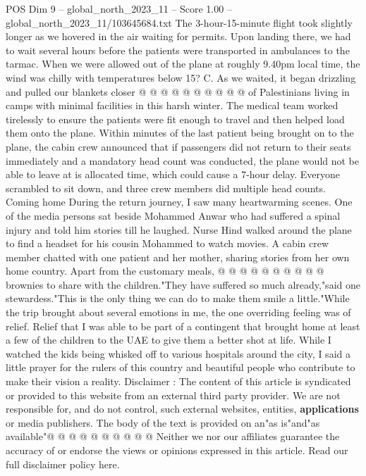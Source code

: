 \begin{textsample}{POS Dim 9 – global\_north\_2023\_11 – Score 1.00 – global\_north\_2023\_11/103645684.txt}
The 3-hour-15-minute flight took slightly longer as we hovered in the air waiting for permits.
Upon landing there, we had to wait several hours before the patients were transported in ambulances to the tarmac.
When we were allowed out of the plane at roughly 9.40pm local time, the wind was chilly with temperatures below 15?
C.
As we waited, it began drizzling and pulled our blankets closer @ @ @ @ @ @ @ @ @ @ of Palestinians living in camps with minimal facilities in this harsh winter.
The medical team worked tirelessly to ensure the patients were fit enough to travel and then helped load them onto the plane.
Within minutes of the last patient being brought on to the plane, the cabin crew announced that if passengers did not return to their seats immediately and a mandatory head count was conducted, the plane would not be able to leave at is allocated time, which could cause a 7-hour delay.
Everyone scrambled to sit down, and three crew members did multiple head counts.
Coming home During the return journey, I saw many heartwarming scenes.
One of the media persons sat beside Mohammed Anwar who had suffered a spinal injury and told him stories till he laughed.
Nurse Hind walked around the plane to find a headset for his cousin Mohammed to watch movies.
A cabin crew member chatted with one patient and her mother, sharing stories from her own home country.
Apart from the customary meals, @ @ @ @ @ @ @ @ @ @ brownies to share with the children."They have suffered so much already,"said one stewardess."This is the only thing we can do to make them smile a little."While the trip brought about several emotions in me, the one overriding feeling was of relief.
Relief that I was able to be part of a contingent that brought home at least a few of the children to the UAE to give them a better shot at life.
While I watched the kids being whisked off to various hospitals around the city, I said a little prayer for the rulers of this country and beautiful people who contribute to make their vision a reality.
Disclaimer : The content of this article is syndicated or provided to this website from an external third party provider.
We are not responsible for, and do not control, such external websites, entities, \textbf{applications} or media publishers.
The body of the text is provided on an"as is"and"as available"@ @ @ @ @ @ @ @ @ @ Neither we nor our affiliates guarantee the accuracy of or endorse the views or opinions expressed in this article.
Read our full disclaimer policy here.

\end{textsample}
